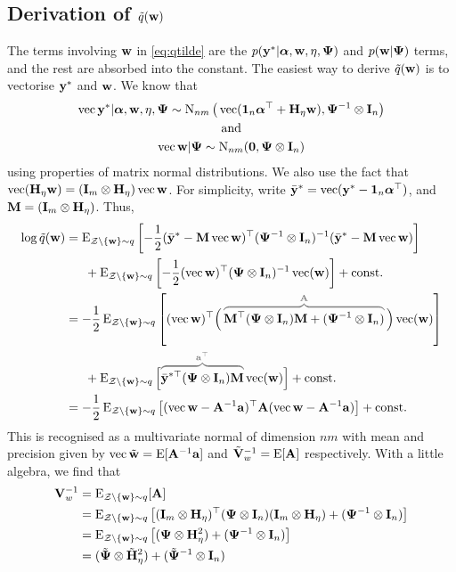 \subsection[Derivation of q w]{Derivation of $\tilde q({\mathbf w})$}

The terms involving ${\mathbf w}$ in \cref{eq:qtilde} are the $p({\mathbf y}^*|{\bm\alpha},{\mathbf w},\eta,{\bm\Psi})$ and $p({\mathbf w}|{\bm\Psi})$ terms, and the rest are absorbed into the constant.
The easiest way to derive $\tilde q({\mathbf w})$ is to vectorise ${\mathbf y}^*$ and ${\mathbf w}$.
We know that
\begin{gather*}
  \operatorname{vec} {\mathbf y}^* |  {\bm\alpha},{\mathbf w},\eta,{\bm\Psi} \sim \operatorname{N}_{nm}\big(\operatorname{vec} ({\mathbf 1}_n{\bm\alpha}^\top + {\mathbf H}_\eta{\mathbf w}), {\bm\Psi}^{-1}\otimes{\mathbf I}_n\big) \\
  \text{and}\\
  \operatorname{vec} {\mathbf w} | {\bm\Psi} \sim \operatorname{N}_{nm} ({\mathbf 0}, {\bm\Psi}\otimes{\mathbf I}_n)
\end{gather*}
using properties of matrix normal distributions.
We also use the fact that $\operatorname{vec} ({\mathbf H}_\eta{\mathbf w}) = ({\mathbf I}_m \otimes {\mathbf H}_\eta)\operatorname{vec}{\mathbf w}$.  %
For simplicity, write $\bar{{\mathbf y}}^* = \operatorname{vec}({\mathbf y}^* - {\mathbf 1}_n{\bm\alpha}^\top)$, and ${\mathbf M} = ({\mathbf I}_m \otimes {\mathbf H}_\eta)$.
Thus,
\begin{align*}
  \log \tilde q(\bw) 
  &= \E_{\cZ\backslash\{\bw \}\sim q} \left[ 
  -\half (\bar\by^* - \bM\vecc\bw )^\top(\bPsi^{-1} \otimes \bI_n)^{-1} (\bar\by^* - \bM\vecc\bw )
  \right] \\
  &\phantom{==} + \E_{\cZ\backslash\{\bw \}\sim q} \left[ 
  -\half (\vecc \bw )^\top(\bPsi \otimes \bI_n)^{-1} \vecc (\bw ) \right] + \const \\
  &= -\half\E_{\cZ\backslash\{\bw \}\sim q} \left[ 
  (\vecc\bw)^\top \Big( \,
  \greyoverbrace{\bM^\top(\bPsi \otimes \bI_n)\bM + (\bPsi^{-1} \otimes \bI_n)}{\bA} 
  \, \Big) \vecc (\bw )
  \right] \\
  &\phantom{==} + \E_{\cZ\backslash\{\bw \}\sim q} \Big[ 
  \greyoverbrace{\bar\by^{*\top} (\bPsi \otimes \bI_n) \bM}{\ba^\top} \vecc (\bw )
  \Big] + \const \\
  &= -\half\E_{\cZ\backslash\{\bw \}\sim q} \left[
  (\vecc\bw - \bA^{-1}\ba)^\top \bA (\vecc\bw - \bA^{-1}\ba)
  \right] + \const
\end{align*}
This is recognised as a multivariate normal of dimension $nm$ with mean and precision given by $\operatorname{vec} \tilde{{\mathbf w}} = \operatorname{E}[{\mathbf A}^{-1}{\mathbf a}]$ and $\tilde{{\mathbf V}}_w ^{-1}= \operatorname{E}[{\mathbf A}]$ respectively.
With a little algebra, we find that
\begin{align*}
  {\mathbf V}_w^{-1} 
  &= \operatorname{E}_{{\mathcal Z}\backslash\{{\mathbf w} \}\sim q} [{\mathbf A}] \\
  &= \operatorname{E}_{{\mathcal Z}\backslash\{{\mathbf w} \}\sim q} \left[({\mathbf I}_m \otimes {\mathbf H}_\eta)^\top({\bm\Psi} \otimes {\mathbf I}_n)({\mathbf I}_m \otimes {\mathbf H}_\eta) + ({\bm\Psi}^{-1} \otimes {\mathbf I}_n) \right] \\
  &= \operatorname{E}_{{\mathcal Z}\backslash\{{\mathbf w} \}\sim q} \left[({\bm\Psi} \otimes {\mathbf H}_\eta^2) + ({\bm\Psi}^{-1} \otimes {\mathbf I}_n) \right] \\
  &= (\tilde{{\bm\Psi}} \otimes \tilde{{\mathbf H}}_\eta^2) + (\tilde{{\bm\Psi}}^{-1} \otimes {\mathbf I}_n) 
\end{align*}
